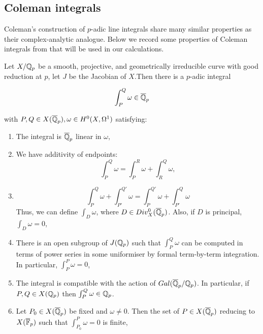 \subsection{Coleman integrals}\label{sec:coleman_integration}

Coleman's construction of $p$-adic line integrals share many similar properties as their complex-analytic analogue. Below we record some properties of Coleman integrals from \cite{Coleman1,coleman85} that will be used in our calculations.

\begin{theorem} \label{coleman_def}
Let $X/\mathbb{Q}_p$ be a smooth, projective, and geometrically irreducible curve with good reduction at $p$, let $J$ be the Jacobian of $X$.Then there is a $p$-adic integral 

\[ \int_P^Q \omega \in \overline{\mathbb{Q}}_p\]

with $P,Q \in X(\overline{\mathbb{Q}}_p), \omega \in H^0(X,\Omega^1)$ satisfying:

\begin{enumerate}
    \item The integral is $\overline{\mathbb{Q}}_p$ linear in $\omega$,
    \item We have additivity of endpoints:
    \begin{equation*}
        \int_P^Q \omega = \int_P^R \omega + \int_R^Q \omega,
    \end{equation*}
    \item 
    \begin{equation*}
        \int_P^Q \omega + \int_{P'}^{Q'} \omega = \int_P^{Q'} \omega + \int_{P'}^Q \omega
    \end{equation*}
        Thus, we can define $\int_D \omega$, where $D \in Div^0_X(\overline{\mathbb{Q}}_p)$. Also, if $D$ is principal, $\int_D \omega = 0$,
        
    \item There is an open subgroup of $J(\mathbb{Q}_p)$ such that $\int_P^Q \omega$ can be computed in terms of power series in some uniformiser by formal term-by-term integration. In particular, $\int_P^P \omega = 0$,



        \item The integral is compatible with the action of $Gal(\overline{\mathbb{Q}}_p/\mathbb{Q}_p)$. In particular, if $P,Q \in X(\mathbb{Q}_p)$ then $\int_P^Q \omega \in \mathbb{Q}_p$.
        \item Let $P_0 \in X(\overline{\mathbb{Q}}_p)$ be fixed and $\omega \neq 0$. Then the set of $P \in X(\overline{\mathbb{Q}}_p)$ reducing to $X(\overline{\mathbb{F}}_p)$ such that $\int_{P_0}^P \omega = 0$ is finite,


\end{enumerate}
\end{theorem}
